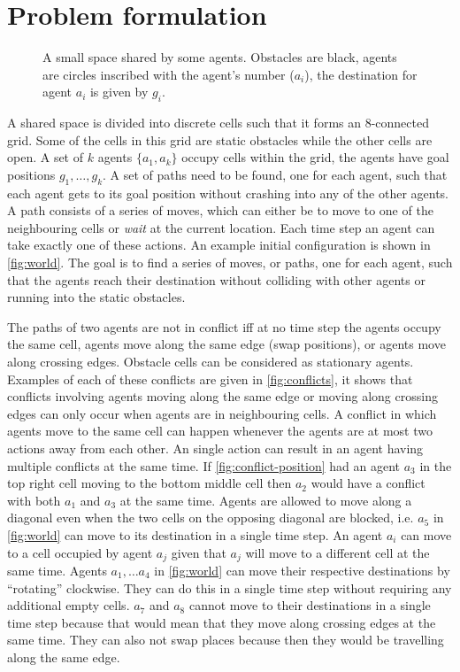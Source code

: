 \section{Problem formulation}\label{sec:problem}

\begin{figure}[t]
    \centering
    \def\svgscale{.7}
    
    \caption{A small space shared by some agents. Obstacles are black, agents
        are circles inscribed with the agent's number ($a_i$), the destination
        for
        agent $a_i$ is given by $g_i$.}
    \label{fig:world}
\end{figure}

A shared space is divided into discrete cells such that it forms an 8-connected
grid. Some of the cells in this grid are static obstacles while the other cells
are open. A set of $k$ agents $\{a_1, a_k\}$ occupy cells within the grid, the
agents have goal positions $g_1, \ldots, g_k$. A set of paths need to be found,
one for each agent, such that each agent gets to its goal position without
crashing into any of the other agents.
A path consists of a series of moves, which can either
be to move to one of the neighbouring cells or \emph{wait} at the current
location. Each time step an agent can take exactly one of these actions.
An example initial configuration is shown in \autoref{fig:world}. The goal is
to find a series of moves, or paths, one for each agent, such that the agents
reach their destination without colliding with other agents or running into the
static obstacles.

The paths of two agents are not in conflict iff at no time step the agents
occupy the same cell, agents move along the same edge (swap positions), or
agents move along crossing edges. Obstacle cells can be considered as
stationary agents. Examples of each of these conflicts are given
in \autoref{fig:conflicts}, it shows that conflicts involving agents moving
along the same edge or moving along crossing edges can only occur when agents
are in neighbouring cells. A conflict in which agents move to the same cell can
happen whenever the agents are at most two actions away from each other. An
single action can result in an agent having multiple conflicts at the same
time. If \autoref{fig:conflict-position} had an agent $a_3$ in the top right
cell moving to the bottom middle cell then $a_2$ would have a conflict with
both $a_1$ and $a_3$ at the same time.
Agents are allowed to move along a diagonal even when the two cells on the
opposing diagonal are blocked, i.e. $a_5$ in \autoref{fig:world} can move to its
destination in a single time step. An agent $a_i$ can move to a cell occupied by
agent $a_j$ given that $a_j$ will move to a different cell at the same time.
Agents $a_1, \ldots a_4$ in \autoref{fig:world} can move their respective
destinations
by ``rotating'' clockwise. They can do this in a single time step without
requiring any additional empty cells. $a_7$ and $a_8$ cannot move to their
destinations in a single time step because that would mean that they move along
crossing edges at the same time. They can also not swap places because then
they would be travelling along the same edge.

